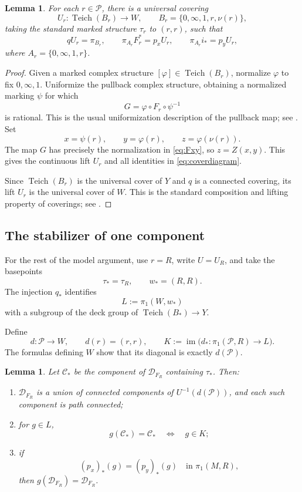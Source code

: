 \documentclass[11pt]{article}
\newcommand{\Teich}{\operatorname{Teich}}
\newcommand{\Def}{\mathcal D}
\newcommand{\Par}{\mathcal P}
\newcommand{\im}{\operatorname{im}}
\newtheorem{lemma}[theorem]{Lemma}
\theoremstyle{definition}
\theoremstyle{remark}
\begin{document}
\begin{lemma}\label{lem:teich}
For each $r\in\Par$, there is a universal covering
\[
U_r:\Teich(B_r)\longrightarrow W,\qquad
B_r=\{0,\infty,1,r,\nu(r)\},
\]
taking the standard marked structure $\tau_r$ to $(r,r)$, such that
\begin{equation}\label{eq:coverdiagram}
qU_r=\pi_{B_r},\qquad
\pi_{A_r}F_r^*=p_xU_r,\qquad
\pi_{A_r}i_*=p_yU_r,
\end{equation}
where $A_r=\{0,\infty,1,r\}$.
\end{lemma}

\begin{proof}
Given a marked complex structure $[\varphi]\in\Teich(B_r)$, normalize
$\varphi$ to fix $0,\infty,1$.  Uniformize the pullback complex
structure, obtaining a normalized marking $\psi$ for which
\[
G=\varphi\circ F_r\circ\psi^{-1}
\]
is rational.  This is the usual uniformization description of the
pullback map; see \cite[Sections~2.1--2.2, Proposition~2.1]{HK}.
Set
\[
x=\psi(r),\qquad y=\varphi(r),\qquad z=\varphi(\nu(r)).
\]
The map $G$ has precisely the normalization in \eqref{eq:Fxy}, so
$z=Z(x,y)$.  This gives the continuous lift $U_r$ and all identities
in \eqref{eq:coverdiagram}.

Since $\Teich(B_r)$ is the universal cover of $Y$ and $q$ is a
connected covering, its lift $U_r$ is the universal cover of $W$.
This is the standard composition and lifting property of coverings;
see \cite[Section~1.3]{H}.
\end{proof}

\subsection{The stabilizer of one component}

For the rest of the model argument, use $r=R$, write $U=U_R$, and
take the basepoints
\[
\tau_*=\tau_R,\qquad w_*=(R,R).
\]
The injection $q_*$ identifies
\[
L:=\pi_1(W,w_*)
\]
with a subgroup of the deck group of $\Teich(B_*)\to Y$.

Define
\[
d:\Par\longrightarrow W,\qquad d(r)=(r,r),
\qquad
K:=\im\bigl(d_*:\pi_1(\Par,R)\to L\bigr).
\]
The formulas defining $W$ show that its diagonal is exactly
$d(\Par)$.

\begin{lemma}\label{lem:stabilizer}
Let $\mathcal C_*$ be the component of $\Def_{F_R}$ containing
$\tau_*$.  Then:
\begin{enumerate}
\item $\Def_{F_R}$ is a union of connected components of
$U^{-1}(d(\Par))$, and each such component is path connected;
\item for $g\in L$,
\[
g(\mathcal C_*)=\mathcal C_*
\quad\Longleftrightarrow\quad g\in K;
\]
\item if
\[
(p_x)_*(g)=(p_y)_*(g)
\quad\text{in }\pi_1(M,R),
\]
then $g(\Def_{F_R})=\Def_{F_R}$.
\end{enumerate}
\end{lemma}
\end{document}
